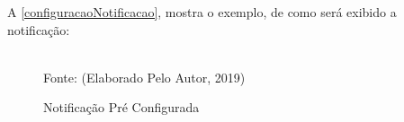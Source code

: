 \newpage
A \autoref{configuracaoNotificacao}, mostra  o exemplo, de como será exibido a notificação:

\begin{figure}[!htpb]
	\centering
	\caption{Notificação Pré Configurada}
	\\
	{\footnotesize Fonte: (Elaborado Pelo Autor, 2019)}
	\label{configuracaoNotificacao}
\end{figure}

